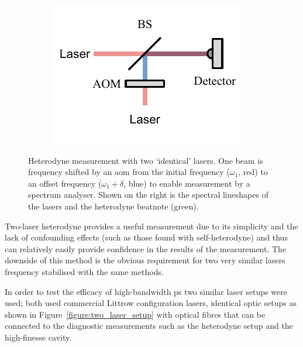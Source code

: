 \begin{figure}
    \begin{subfigure}{0.49\linewidth}
    \includegraphics{part1/Figs/HeterodyneTwoLasers.pdf}
    \end{subfigure}
    \begin{subfigure}{0.49\linewidth}
    
    \end{subfigure}
    \caption[Heterodyne measurement with a two `identical' lasers.]{Heterodyne measurement with two `identical' lasers. One beam is frequency shifted by an \gls{aom} from the initial frequency ($\omega_1$, red) to an offset frequency ($\omega_1+\delta$, blue) to enable measurement by a spectrum analyser. Shown on the right is the spectral lineshapes of the lasers and the heterodyne beatnote (green).}
    \label{figure:two-laser_heterodyne}
\end{figure}

Two-laser heterodyne provides a useful measurement due to its simplicity and the lack of confounding effects (such as those found with self-heterodyne) and thus can relatively easily provide confidence in the results of the measurement.
The downside of this method is the obvious requirement for two very similar lasers frequency stabilised with the same methods.

In order to test the efficacy of high-bandwidth \gls{ps} two similar laser setups were used; both used commercial Littrow configuration lasers, identical optic setups as shown in Figure~\ref{figure:two_laser_setup} with optical fibres that can be connected to the diagnostic measurements such as the heterodyne setup and the high-finesse cavity.

